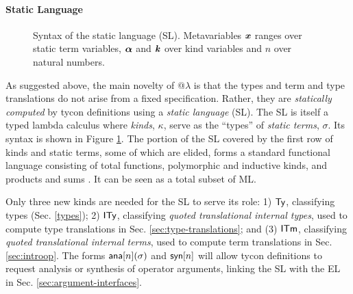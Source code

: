 \paragraph{Static Language}
\begin{figure}[t]
\small
\hspace{-5px}
\caption{Syntax of the static language (SL). Metavariables ${\textbf{\textit{x}}}$ ranges over static term variables, $\boldsymbol{\alpha}$ and $\textbf{\textit{k}}$ over kind variables and $n$ over natural numbers.}
\label{syntax-SL}
\end{figure}
As suggested above, the main novelty of @$\lambda$ is that the types and term and type translations do not arise from a fixed specification. Rather, they are \emph{statically computed} by tycon definitions using a \emph{static language} (SL). The SL is itself a typed lambda calculus where  
\emph{kinds}, $\kappa$, serve as the ``types'' of \emph{static terms}, $\sigma$.  Its syntax is shown in Figure \ref{syntax-SL}. The portion of the SL covered by the first row of kinds and static terms, some of which are elided, forms a standard functional language consisting of total functions, polymorphic and inductive kinds, and products and sums  \cite{pfpl}. It can be seen as a total subset of ML.%

Only three new  kinds are needed for the SL to serve its role: 1) ${\sf Ty}$, classifying types (Sec. \ref{types}); 2) ${\sf ITy}$, classifying \emph{quoted translational internal types}, used to {compute} type translations in Sec. \ref{sec:type-translations}; and (3) ${\sf ITm}$, classifying \emph{quoted translational internal terms}, used to {compute} term translations in Sec. \ref{sec:introop}. The forms ${\sf ana}[n](\sigma)$ and ${\sf syn}[n]$ will  allow tycon definitions to request analysis or synthesis of operator arguments, linking the SL with the  EL in Sec. \ref{sec:argument-interfaces}.

